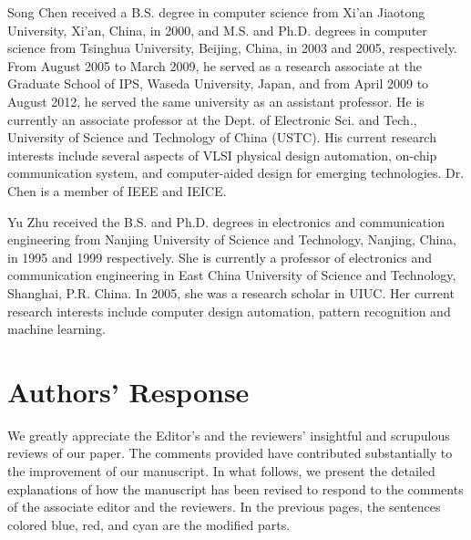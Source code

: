 \documentclass[10pt,journal, compsoc]{IEEEtran}
\begin{document}
\begin{IEEEbiography}{Song Chen}
received a B.S. degree in computer science from Xi'an Jiaotong University, Xi'an, China, in 2000, and M.S. and Ph.D. degrees in computer science from Tsinghua University, Beijing, China, in 2003 and 2005, respectively. From August 2005 to March 2009, he served as a research associate at the Graduate School of IPS, Waseda University, Japan, and from April 2009 to August 2012, he served the same university as an assistant professor. He is currently an associate professor at the Dept. of Electronic Sci. and Tech., University of Science and Technology of China (USTC). His current research interests include several aspects of VLSI physical design automation, on-chip communication system, and computer-aided design for emerging technologies. Dr. Chen is a member of IEEE and IEICE.
\end{IEEEbiography}


\begin{IEEEbiography}{Yu Zhu}
received the B.S. and Ph.D. degrees in electronics and communication engineering from Nanjing University of Science and Technology, Nanjing, China, in 1995 and 1999 respectively. She is currently a professor of electronics and communication engineering in East China University of Science and Technology, Shanghai, P.R. China. In 2005, she was a research scholar in UIUC. Her current research interests include computer design automation, pattern recognition and machine learning.
\end{IEEEbiography}

\clearpage

\section*{{\Large Authors' Response}}
We greatly appreciate the Editor's and the reviewers' insightful and scrupulous reviews of our paper. The comments provided have contributed substantially to the improvement of our manuscript. In what follows, we present the detailed explanations of how the manuscript has been revised to respond to the comments of the associate editor and the reviewers. In the previous pages, the sentences colored blue, red, and cyan are the modified parts.
\end{document}
